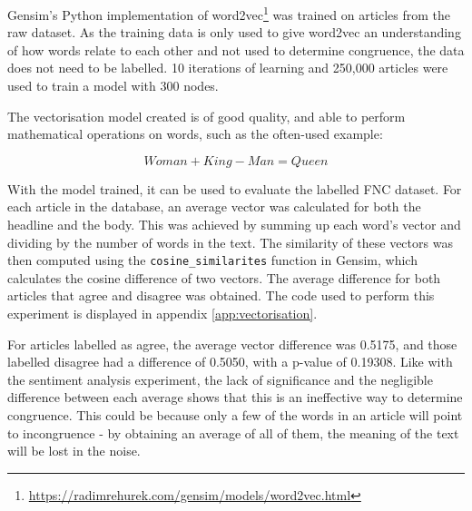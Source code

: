 Gensim's Python implementation of word2vec\footnote{\url{https://radimrehurek.com/gensim/models/word2vec.html}} was trained on articles from the raw dataset. As the training data is only used to give word2vec an understanding of how words relate to each other and not used to determine congruence, the data does not need to be labelled. 10 iterations of learning and 250,000 articles were used to train a model with 300 nodes.

The vectorisation model created is of good quality, and able to perform mathematical operations on words, such as the often-used example:

\[Woman + King - Man = Queen\]

With the model trained, it can be used to evaluate the labelled FNC dataset.
For each article in the database, an average vector was calculated for both the headline and the body. This was achieved by summing up each word's vector and dividing by the number of words in the text. The similarity of these vectors was then computed using the \texttt{cosine\_similarites} function in Gensim, which calculates the cosine difference of two vectors. The average difference for both articles that agree and disagree was obtained. The code used to perform this experiment is displayed in appendix \ref{app:vectorisation}.

For articles labelled as agree, the average vector difference was 0.5175, and those labelled disagree had a difference of 0.5050, with a p-value of 0.19308. Like with the sentiment analysis experiment, the lack of significance and the negligible difference between each average shows that this is an ineffective way to determine congruence. This could be because only a few of the words in an article will point to incongruence - by obtaining an average of all of them, the meaning of the text will be lost in the noise.

